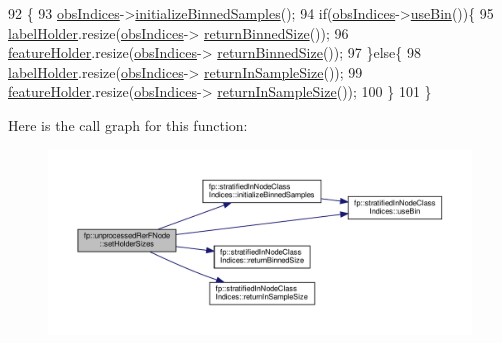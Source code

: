 \begin{DoxyCode}
92                                             \{
93                     \hyperlink{classfp_1_1unprocessedRerFNode_ad52d9d508bf378bc793b8cf961163735}{obsIndices}->\hyperlink{classfp_1_1stratifiedInNodeClassIndices_ae9907f8984615f91417fb7961e1b582d}{initializeBinnedSamples}();
94                     \textcolor{keywordflow}{if}(\hyperlink{classfp_1_1unprocessedRerFNode_ad52d9d508bf378bc793b8cf961163735}{obsIndices}->\hyperlink{classfp_1_1stratifiedInNodeClassIndices_af740a8054cefe977f8f1288fc6b39109}{useBin}())\{
95                         \hyperlink{classfp_1_1unprocessedRerFNode_a9e1a9728861a19034c9b17d5eaa2891d}{labelHolder}.resize(\hyperlink{classfp_1_1unprocessedRerFNode_ad52d9d508bf378bc793b8cf961163735}{obsIndices}->
      \hyperlink{classfp_1_1stratifiedInNodeClassIndices_a9f77fe5e638170c4ad4ce99541561cfc}{returnBinnedSize}());
96                         \hyperlink{classfp_1_1unprocessedRerFNode_a09fa17210a5916239cba6716c636cc4e}{featureHolder}.resize(\hyperlink{classfp_1_1unprocessedRerFNode_ad52d9d508bf378bc793b8cf961163735}{obsIndices}->
      \hyperlink{classfp_1_1stratifiedInNodeClassIndices_a9f77fe5e638170c4ad4ce99541561cfc}{returnBinnedSize}());
97                     \}\textcolor{keywordflow}{else}\{
98                         \hyperlink{classfp_1_1unprocessedRerFNode_a9e1a9728861a19034c9b17d5eaa2891d}{labelHolder}.resize(\hyperlink{classfp_1_1unprocessedRerFNode_ad52d9d508bf378bc793b8cf961163735}{obsIndices}->
      \hyperlink{classfp_1_1stratifiedInNodeClassIndices_a596235ffec7250fabd2818d395b39c66}{returnInSampleSize}());
99                         \hyperlink{classfp_1_1unprocessedRerFNode_a09fa17210a5916239cba6716c636cc4e}{featureHolder}.resize(\hyperlink{classfp_1_1unprocessedRerFNode_ad52d9d508bf378bc793b8cf961163735}{obsIndices}->
      \hyperlink{classfp_1_1stratifiedInNodeClassIndices_a596235ffec7250fabd2818d395b39c66}{returnInSampleSize}());
100                     \}
101                 \}
\end{DoxyCode}
Here is the call graph for this function\+:
\nopagebreak
\begin{figure}[H]
\begin{center}
\leavevmode
\includegraphics[width=350pt]{classfp_1_1unprocessedRerFNode_a0fccfed626582cf730f6302fc2f703c4_cgraph}
\end{center}
\end{figure}
\mbox{\label{classfp_1_1unprocessedRerFNode_a5ec1c45ede99474478d616f748c733ba}} 
